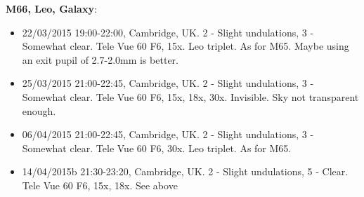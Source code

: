 {\bf M66, Leo, Galaxy}:
\begin{itemize}
\item 22/03/2015 19:00-22:00, Cambridge, UK. 2 - Slight undulations, 3 - Somewhat clear. Tele Vue 60 F6, 15x. Leo triplet. As for M65. Maybe using an exit pupil of 2.7-2.0mm is better.
\item 25/03/2015 21:00-22:45, Cambridge, UK. 2 - Slight undulations, 3 - Somewhat clear. Tele Vue 60 F6, 15x, 18x, 30x. Invisible. Sky not transparent enough.
\item 06/04/2015 21:00-22:45, Cambridge, UK. 2 - Slight undulations, 3 - Somewhat clear. Tele Vue 60 F6, 30x. Leo triplet. As for M65. 
\item 14/04/2015b 21:30-23:20, Cambridge, UK. 2 - Slight undulations, 5 - Clear. Tele Vue 60 F6, 15x, 18x. See above
\end{itemize}
